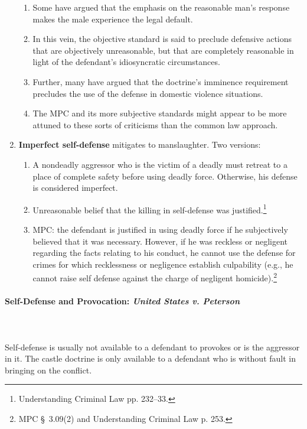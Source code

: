 \begin{enumerate}
\begin{enumerate}
        \item Some have argued that the emphasis on the reasonable man's 
        response makes the male experience the legal default.
        \item In this vein, the objective standard is said to preclude 
        defensive actions that are objectively unreasonable, but that are 
        completely reasonable in light of the defendant's idiosyncratic 
        circumstances.
        \item Further, many have argued that the doctrine's imminence 
        requirement precludes the use of the defense in domestic violence 
        situations.
        \item The MPC and its more subjective standards might appear to be 
        more attuned to these sorts of criticisms than the common law 
        approach. 
    \end{enumerate}
    \item \textbf{Imperfect self-defense} mitigates to manslaughter. Two versions:
    \begin{enumerate}
        \item A nondeadly aggressor who is the victim of a deadly must retreat 
        to a place of complete safety before using deadly force. Otherwise, 
        his defense is considered imperfect.
        \item Unreasonable belief that the killing in self-defense was 
        justified.\footnote{Understanding Criminal Law pp. 232--33.}
        \item MPC: the defendant is justified in using deadly force if he 
        subjectively believed that it was necessary. However, if he was 
        reckless or negligent regarding the facts relating to his conduct, he 
        cannot use the defense for crimes for which recklessness or negligence 
        establish culpability (e.g., he cannot raise self defense against the 
        charge of negligent homicide).\footnote{MPC \S\ 3.09(2) and 
        Understanding Criminal Law p. 253.}
    \end{enumerate}
\end{enumerate}

\paragraph{Self-Defense and Provocation: \emph{United States v. Peterson}}
~\\\\
Self-defense is usually not available to a defendant to provokes or is the 
aggressor in it. The castle doctrine is only available to a defendant who is 
without fault in bringing on the conflict.

